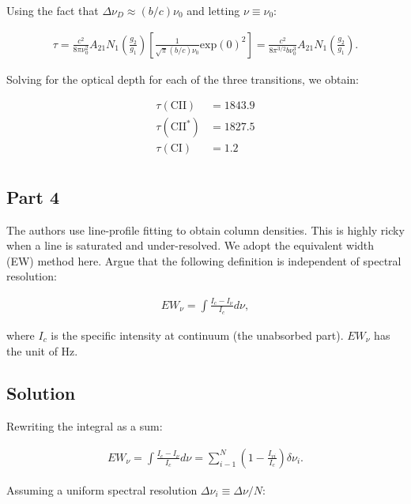 \documentclass[12pt]{article}
\begin{document}
Using the fact that $\Delta\nu_D \approx (b/c)\nu_0$ and letting $\nu \equiv \nu_0$:

\begin{equation*}
\begin{split}
\tau = \frac{c^2}{8\pi \nu_0^2}A_{21}N_1\left(\frac{g_2}{g_1}\right)\left[\frac{1}{\sqrt{\pi}(b/c)\nu_0}\mathrm{exp}(0)^2\right]
= \frac{c^2}{8\pi^{3/2}b\nu_0^3}A_{21}N_1\left(\frac{g_2}{g_1}\right).
\end{split}
\end{equation*}

Solving for the optical depth for each of the three transitions, we obtain:

\begin{equation*}
\begin{split}
\tau(\mathrm{CII}) &= 1843.9\\
\tau(\mathrm{CII^*}) &= 1827.5\\
\tau(\mathrm{CI}) &= 1.2\\
\end{split}
\end{equation*}

\subsection*{Part 4}

The authors use line-profile fitting to obtain column densities. This is highly ricky when a line is saturated and under-resolved. We adopt the equivalent width (EW) method here. Argue that the following definition is independent of spectral resolution:

\begin{align*}
EW_\nu = \int\frac{I_c - I_\nu}{I_c}d\nu,
\end{align*}

where $I_c$ is the specific intensity at continuum (the unabsorbed part). $EW_\nu$ has the unit of Hz.

\subsection*{Solution}

Rewriting the integral as a sum:

\begin{align*}
EW_\nu = \int\frac{I_c - I_\nu}{I_c}d\nu = \sum_{i-1}^N\left(1 - \frac{I_{vi}}{I_c}\right)\delta\nu_i.
\end{align*}

Assuming a uniform spectral resolution $\Delta\nu_i \equiv \Delta\nu/N$:
\end{document}
